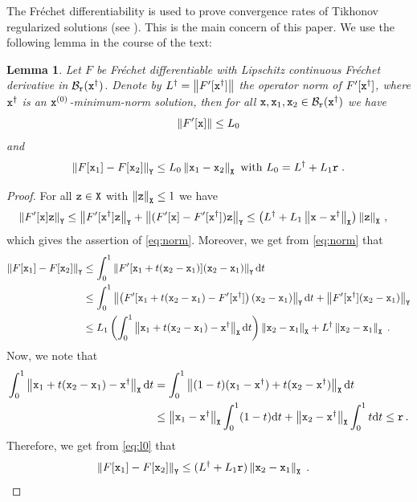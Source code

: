 \documentclass[10pt]{article}
\numberwithin{equation}{section}
\newtheorem{lemma}{Lemma}[section]
\theoremstyle{nonumberplain}
\newtheorem{proof}{Proof}
\newcommand{\norm}[1]{\left\|#1\right\|}
\newcommand{\X}{{\tt X}}
\newcommand{\Y}{{\tt Y}}
\newcommand{\x}{{\tt x}}
\newcommand{\xdag}{\x^\dagger}
\newcommand{\z}{{\tt z}}
\begin{document}
The Fr\'echet differentiability is used to prove convergence rates of Tikhonov regularized solutions (see \cite[Theorem 10.4]{EngHanNeu96}). This is the main concern of this paper.
We use the following lemma in the course of the text: 
\begin{lemma} \label{le:lipschitz}
	Let $F$ be Fr\'echet differentiable with Lipschitz continuous Fr\'echet derivative in $\mathcal{B}_{\tt r}(\xdag)$.
	Denote by $L^\dagger = \norm{F'[\xdag]}$ the operator norm of $F'[\xdag]$, where $\xdag$ is an $\x^{(0)}$-minimum-norm solution, then for all $\x,\x_1,\x_2 \in \mathcal{B}_{\tt r}(\xdag)$ we have
	\begin{equation} \label{eq:norm}
		\norm{F'[\x]} \leq L_0
	\end{equation}
	and
	\begin{equation} \label{eq:lipschitz0}
		\norm{F[\x_1]-F[\x_2]}_\Y \leq L_0 \norm{\x_1-\x_2}_\X \text{ with } L_0=L^\dagger + L_1{\tt r}\;.
	\end{equation}
\end{lemma}
\begin{proof}
For all $\z \in \X$ with $\norm{\z}_\X \leq 1$ we have
\begin{equation*}
	\begin{aligned}
		\norm{F'[\x] \z}_\Y &\leq \norm{F'[\xdag] \z}_\Y + \norm{(F'[\x]-F'[\xdag]) \z}_\Y
		\leq \left( L^\dagger + L_1 \norm{\x-\xdag}_\X \right) \norm{\z}_\X\,,
	\end{aligned}
\end{equation*}	
which gives the assertion of \autoref{eq:norm}.
Moreover, we get from \autoref{eq:norm} that
\begin{equation} \label{eq:l0} \begin{aligned}
		\norm{F[\x_1]-F[\x_2]}_\Y &\leq \int_0^1 \norm{F'[\x_1+t(\x_2-\x_1)](\x_2-\x_1)}_\Y \mathrm{d}t \\&
		\leq \int_0^1 \norm{\left(F'[\x_1+t(\x_2-\x_1)-F'[\xdag]\right) (\x_2-\x_1)}_\Y \mathrm{d}t + \norm{F'[\xdag](\x_2-\x_1)}_\Y\\
		&\leq L_1 \left(\int_0^1 \norm{\x_1+t(\x_2-\x_1)-\xdag}_\X \mathrm{d}t\right) \norm{\x_2-\x_1}_\X + L^\dagger\norm{\x_2-\x_1}_\X \;.
	\end{aligned}
\end{equation}
Now, we note that 
\begin{equation*}
	\begin{aligned}
		\int_0^1 \norm{\x_1+t(\x_2-\x_1)-\xdag}_\X \mathrm{d}t 
		&= \int_0^1 \norm{(1-t)(\x_1-\xdag) +t (\x_2-\xdag)}_\X \mathrm{d}t\\
		&\leq \norm{\x_1-\xdag}_\X \int_0^1 (1-t) \mathrm{d}t  + \norm{\x_2-\xdag}_\X
		\int_0^1t \mathrm{d}t \leq {\tt r}\,.
	\end{aligned}
\end{equation*}
Therefore, we get from \autoref{eq:l0} that
\begin{equation*}\begin{aligned}
	\norm{F[\x_1]-F[\x_2]}_\Y &\leq (L^\dagger + L_1{\tt r}) \norm{\x_2-\x_1}_\X\;.
\end{aligned}
\end{equation*}
\end{proof}
\end{document}
